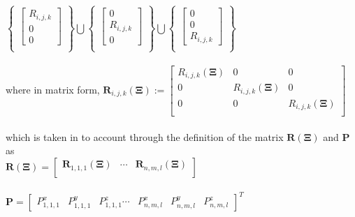 $ \begin{Bmatrix}
\begin{bmatrix}
 R_{i,j,k}\\ 
 0\\
 0  
\end{bmatrix}\\ 
\end{Bmatrix}
\bigcup
\begin{Bmatrix}
\begin{bmatrix}
 0\\ 
 R_{i,j,k}\\
 0  
\end{bmatrix}\\ 
\end{Bmatrix}
\bigcup
\begin{Bmatrix}
\begin{bmatrix}
 0\\ 
 0\\
 R_{i,j,k}  
\end{bmatrix}\\ 
\end{Bmatrix}
$\\
\\

where in matrix form,
$\bm R_{i,j,k}({\mathbf{\Xi}}) :=
 \begin{bmatrix}
 R_{i,j,k}({\mathbf{\Xi}}) &0 &0 \\ 
 0&R_{i,j,k}({\mathbf{\Xi}})&0  \\ 
 0 &0&R_{i,j,k}({\mathbf{\Xi}}) \\ 
\end{bmatrix}$\\
\\

which is taken in to account through the definition of the matrix $ \mathbf{R(\Xi)}$ and $\mathbf{P}$ as \\

$\mathbf{R(\bm \Xi)} = \begin{bmatrix}
 \bm R_{1,1,1}({\mathbf{\Xi}}) &\cdots  &\bm R_{n,m,l}({\mathbf{\Xi}})  \\ 
\end{bmatrix}$
\\
\\
$\mathbf{P} = \begin{bmatrix}
 P_{1,1,1}^x& 
P_{1,1,1}^y& 
P_{1,1,1}^z 
\cdots&  
P_{n,m,l}^x& 
P_{n,m,l}^y& 
P_{n,m,l}^z 
\end{bmatrix}^{T}$\\

